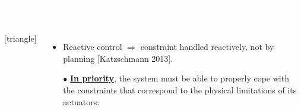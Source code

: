 \begin{frame}[noframenumbering]
\frametitle{{\textcolor{white}{\hspace{0.3cm}Reactive control -- the problem}}}

\begin{columns}
\column{.98\paperwidth}

[triangle]                        
\begin{itemize}
\item {\color{red}Reactive control} {\color{blue-violet}\textbf{$\Rightarrow$}} {\color{red}constraint handled reactively, not by planning} [Katzschmann 2013].
\setlength\itemsep{1em}
\item[$\bullet$] {\color{blue-violet}\textbf{\underline{In priority}}}, the system must be able to properly cope with the constraints that correspond to the physical limitations of its actuators:



\begin{columns}

\end{columns}
\end{itemize}


\end{columns}

\end{frame}











